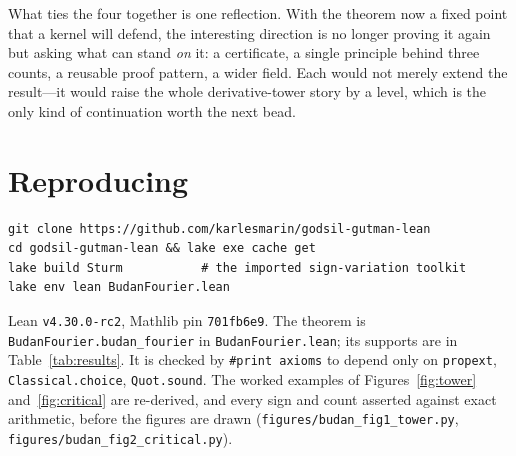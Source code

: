 \documentclass[11pt]{article}
\newcommand{\lean}[1]{\texttt{#1}}
\begin{document}
\noindent What ties the four together is one reflection. With the theorem now a fixed point that a
kernel will defend, the interesting direction is no longer proving it again but asking what can stand
\emph{on} it: a certificate, a single principle behind three counts, a reusable proof pattern, a wider
field. Each would not merely extend the result---it would raise the whole derivative-tower story by a
level, which is the only kind of continuation worth the next bead.

\section*{Reproducing}
\begin{verbatim}
git clone https://github.com/karlesmarin/godsil-gutman-lean
cd godsil-gutman-lean && lake exe cache get
lake build Sturm           # the imported sign-variation toolkit
lake env lean BudanFourier.lean
\end{verbatim}
Lean \lean{v4.30.0-rc2}, Mathlib pin \lean{701fb6e9}. The theorem is \lean{BudanFourier.budan\_fourier}
in \lean{BudanFourier.lean}; its supports are in Table~\ref{tab:results}. It is checked by \lean{\#print
axioms} to depend only on \lean{propext}, \lean{Classical.choice}, \lean{Quot.sound}. The worked
examples of Figures~\ref{fig:tower} and~\ref{fig:critical} are re-derived, and every sign and count
asserted against exact arithmetic, before the figures are drawn (\lean{figures/budan\_fig1\_tower.py},
\lean{figures/budan\_fig2\_critical.py}).
\end{document}
